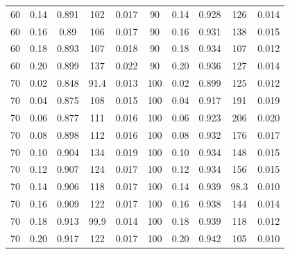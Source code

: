 \documentclass[12pt]{article}
\begin{document}
\begin{table}[h!]
\begin{tabular}{c c | c | c c ||c c | c | c c |}
				60	&	0.14	&	0.891	&	102	&	0.017	&	90	&	0.14	&	0.928	&	126	&	0.014	\\
				60	&	0.16	&	0.89	&	106	&	0.017	&	90	&	0.16	&	0.931	&	138	&	0.015	\\
				60	&	0.18	&	0.893	&	107	&	0.018	&	90	&	0.18	&	0.934	&	107	&	0.012	\\
				60	&	0.20	&	0.899	&	137	&	0.022	&	90	&	0.20	&	0.936	&	127	&	0.014	\\
				70	&	0.02	&	0.848	&	91.4	&	0.013	&	100	&	0.02	&	0.899	&	125	&	0.012	\\
				70	&	0.04	&	0.875	&	108	&	0.015	&	100	&	0.04	&	0.917	&	191	&	0.019	\\
				70	&	0.06	&	0.877	&	111	&	0.016	&	100	&	0.06	&	0.923	&	206	&	0.020	\\
				70	&	0.08	&	0.898	&	112	&	0.016	&	100	&	0.08	&	0.932	&	176	&	0.017	\\
				70	&	0.10	&	0.904	&	134	&	0.019	&	100	&	0.10	&	0.934	&	148	&	0.015	\\
				70	&	0.12	&	0.907	&	124	&	0.017	&	100	&	0.12	&	0.934	&	156	&	0.015	\\
				70	&	0.14	&	0.906	&	118	&	0.017	&	100	&	0.14	&	0.939	&	98.3	&	0.010	\\
				70	&	0.16	&	0.909	&	122	&	0.017	&	100	&	0.16	&	0.938	&	144	&	0.014	\\
				70	&	0.18	&	0.913	&	99.9	&	0.014	&	100	&	0.18	&	0.939	&	118	&	0.012	\\
				70	&	0.20	&	0.917	&	122	&	0.017	&	100	&	0.20	&	0.942	&	105	&	0.010	\\
				\hline
			\end{tabular}
			\end{table}
\end{document}
